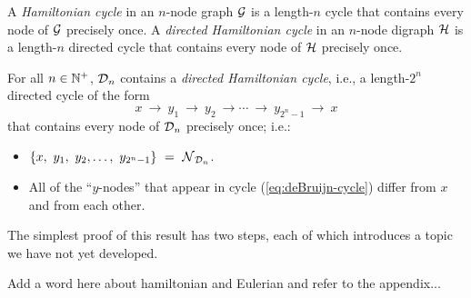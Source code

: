 A {\it Hamiltonian cycle} in an $n$-node graph $\mbox{$\cal G$}$ is a length-$n$
cycle that contains every node of $\mbox{$\cal G$}$ precisely once.  A {\it
  directed Hamiltonian cycle} in an $n$-node digraph $\mbox{$\cal H$}$ is a
length-$n$ directed cycle that contains every node of $\mbox{$\cal H$}$ precisely
once.

\begin{prop}
\label{thm:deBruijn-Hamiltonian}
For all $n \in \mathbb{N}^+$, $\mbox{$\cal D$}_n$ contains a {\em directed Hamiltonian
  cycle}, 
i.e., a length-$2^n$ directed cycle of the form
\begin{equation}
\label{eq:deBruijn-cycle}
 x \ \rightarrow \ y_1 \ \rightarrow \ y_2 \ \rightarrow \cdots
\ \rightarrow \ y_{2^n-1} \ \rightarrow \ x
\end{equation}
that contains every node of $\mbox{$\cal D$}_n$ precisely once; i.e.:
\begin{itemize}
\item
$\{x, \ y_1, \ y_2, \ldots, \ y_{2^n-1}\} \ = \ \n_{\fd_n}$.
\item
All of the ``$y$-nodes'' that appear in cycle
(\ref{eq:deBruijn-cycle}) differ from $x$ and from each other.
\end{itemize}
\end{prop}

The simplest proof of this result has two steps, each of which
introduces a topic we have not yet developed.

{\Denis Add a word here about hamiltonian and Eulerian and refer to the appendix...}

